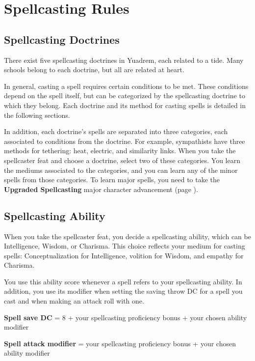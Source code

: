 \section{Spellcasting Rules} \label{sec::spellcastingrules}
\subsection*{Spellcasting Doctrines}
    There exist five spellcasting doctrines in Yuadrem, each related to a tide.
    Many schools belong to each doctrine, but all are related at heart.

    In general, casting a spell requires certain conditions to be met.
    These conditions depend on the spell itself, but can be categorized by the spellcasting doctrine to which they belong.
    Each doctrine and its method for casting spells is detailed in the following sections.

    In addition, each doctrine's spells are separated into three categories, each associated to conditions from the doctrine.
    For example, sympathists have three methods for tethering: heat, electric, and similarity links.
    When you take the spellcaster feat and choose a doctrine, select two of these categories.
    You learn the mediums associated to the categories, and you can learn any of the minor spells from those categories.
    To learn major spells, you need to take the \textbf{Upgraded Spellcasting} major character advancement (page \pageref{mca::upgradedspellcasting}).

\subsection*{Spellcasting Ability}
    When you take the spellcaster feat, you decide a spellcasting ability, which can be Intelligence, Wisdom, or Charisma.
    This choice reflects your medium for casting spells: Conceptualization for Intelligence, volition for Wisdom, and empathy for Charisma.

    You use this ability score whenever a spell refers to your spellcasting ability.
    In addition, you use its modifier when setting the saving throw DC for a spell you cast and when making an attack roll with one.

    \textbf{Spell save DC} = 8 + your spellcasting proficiency bonus + your chosen ability modifier

    \textbf{Spell attack modifier} = your spellcasting proficiency bonus + your chosen ability modifier

